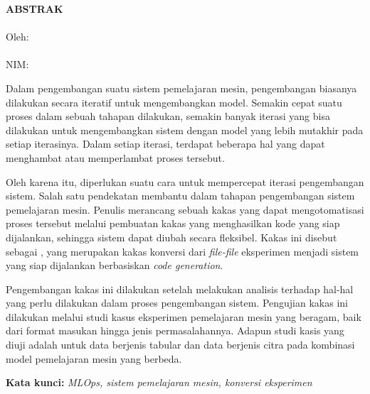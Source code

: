 \clearpage
{}
\begin{center}
  \textbf{\large \MakeUppercase{Abstrak}} \\[2em]
  \textbf{\large \MakeUppercase{\thesistitle}} \\[1em]
  \large
  Oleh: \\
  \MakeUppercase{\theauthor} \\
  NIM:~\nim{}
\end{center}

Dalam pengembangan suatu sistem pemelajaran mesin, pengembangan biasanya dilakukan secara iteratif untuk mengembangkan model.
Semakin cepat suatu proses dalam sebuah tahapan dilakukan, semakin banyak iterasi yang bisa dilakukan untuk mengembangkan sistem dengan model yang lebih mutakhir pada setiap iterasinya.
Dalam setiap iterasi, terdapat beberapa hal yang dapat menghambat atau memperlambat proses tersebut.

Oleh karena itu, diperlukan suatu cara untuk mempercepat iterasi pengembangan sistem.
Salah satu pendekatan membantu dalam tahapan pengembangan sistem pemelajaran mesin.
Penulis merancang sebuah kakas yang dapat mengotomatisasi proses tersebut melalui pembuatan kakas yang menghasilkan kode yang siap dijalankan, sehingga sistem dapat diubah secara fleksibel.
Kakas ini disebut sebagai , yang merupakan kakas konversi dari \textit{file-file} eksperimen menjadi sistem yang siap dijalankan berbasiskan \textit{code generation}.

Pengembangan kakas ini dilakukan setelah melakukan analisis terhadap hal-hal yang perlu dilakukan dalam proses pengembangan sistem.
Pengujian kakas ini dilakukan melalui studi kasus eksperimen pemelajaran mesin yang beragam, baik dari format masukan hingga jenis permasalahannya.
Adapun studi kasis yang diuji adalah untuk data berjenis tabular dan data berjenis citra pada kombinasi model pemelajaran mesin yang berbeda.

\noindent \textbf{Kata kunci:} \emph{MLOps, sistem pemelajaran mesin, konversi eksperimen}
